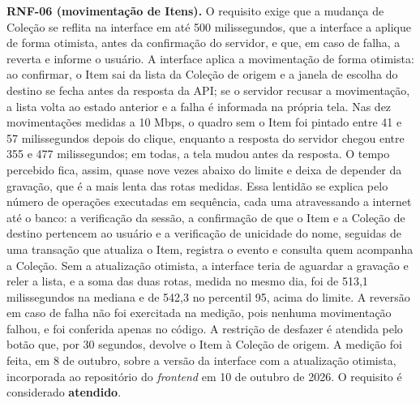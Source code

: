 \textbf{RNF-06 (movimentação de Itens).} O requisito exige que a mudança de Coleção se reflita na interface em até 500 milissegundos, que a interface a aplique de forma otimista, antes da confirmação do servidor, e que, em caso de falha, a reverta e informe o usuário. A interface aplica a movimentação de forma otimista: ao confirmar, o Item sai da lista da Coleção de origem e a janela de escolha do destino se fecha antes da resposta da API; se o servidor recusar a movimentação, a lista volta ao estado anterior e a falha é informada na própria tela. Nas dez movimentações medidas a 10 Mbps, o quadro sem o Item foi pintado entre 41 e 57 milissegundos depois do clique, enquanto a resposta do servidor chegou entre 355 e 477 milissegundos; em todas, a tela mudou antes da resposta. O tempo percebido fica, assim, quase nove vezes abaixo do limite e deixa de depender da gravação, que é a mais lenta das rotas medidas. Essa lentidão se explica pelo número de operações executadas em sequência, cada uma atravessando a internet até o banco: a verificação da sessão, a confirmação de que o Item e a Coleção de destino pertencem ao usuário e a verificação de unicidade do nome, seguidas de uma transação que atualiza o Item, registra o evento e consulta quem acompanha a Coleção. Sem a atualização otimista, a interface teria de aguardar a gravação e reler a lista, e a soma das duas rotas, medida no mesmo dia, foi de 513,1 milissegundos na mediana e de 542,3 no percentil 95, acima do limite. A reversão em caso de falha não foi exercitada na medição, pois nenhuma movimentação falhou, e foi conferida apenas no código. A restrição de desfazer é atendida pelo botão que, por 30 segundos, devolve o Item à Coleção de origem. A medição foi feita, em 8 de outubro, sobre a versão da interface com a atualização otimista, incorporada ao repositório do \textit{frontend} em 10 de outubro de 2026. O requisito é considerado \textbf{atendido}.

